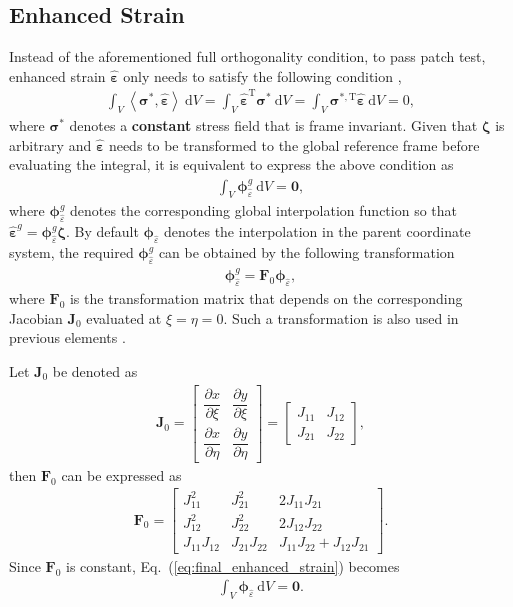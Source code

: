 \documentclass[3p,sort&compress,review,11pt]{elsarticle}
\newcommand*{\md}[1]{\mathrm{d}#1}
\newcommand*{\mT}{\mathrm{T}}
\newcommand*{\pfrac}[2]{\dfrac{\partial#1}{\partial#2}}
\newcommand*{\eqsref}[1]{Eq.~(\ref{#1})}
\newcommand*{\mb}{\bm}
\begin{document}
\subsection{Enhanced Strain}
Instead of the aforementioned full orthogonality condition, to pass patch test, enhanced strain $\hat{\mb{\varepsilon}}$ only needs to satisfy the following condition \citep{Simo1990,Taylor1976},
\begin{gather*}
\int_V\left\langle\mb{\sigma}^*,\hat{\mb{\varepsilon}}\right\rangle~\md{V}=\int_V\hat{\mb{\varepsilon}}^\mT\mb{\sigma}^*~\md{V}=\int_V\mb{\sigma}^{*,\mT}\hat{\mb{\varepsilon}}~\md{V}=0,
\end{gather*}
where $\mb{\sigma}^*$ denotes a \textbf{constant} stress field that is frame invariant. Given that $\mb{\zeta}$ is arbitrary and $\hat{\mb{\varepsilon}}$ needs to be transformed to the global reference frame before evaluating the integral, it is equivalent to express the above condition as
\begin{gather}\label{eq:final_enhanced_strain}
\int_V\mb{\phi}_{\hat{\varepsilon}}^g~\md{V}=\mb{0},
\end{gather}
where $\mb{\phi}_{\hat{\varepsilon}}^g$ denotes the corresponding global interpolation function so that $\hat{\mb{\varepsilon}}^g=\mb{\phi}_{\hat{\varepsilon}}^g\mb{\zeta}$. By default $\mb{\phi}_{\hat{\varepsilon}}$ denotes the interpolation in the parent coordinate system, the required $\mb{\phi}_{\hat{\varepsilon}}^g$ can be obtained by the following transformation
\begin{gather}\label{eq:enhanced_strain_trans}
\mb{\phi}_{\hat{\varepsilon}}^g=\mb{F}_0\mb{\phi}_{\hat{\varepsilon}},
\end{gather}
where $\mb{F}_0$ is the transformation matrix that depends on the corresponding Jacobian $\mb{J}_0$ evaluated at $\xi=\eta=0$. Such a transformation is also used in previous elements \citep[e.g.,][]{Pian1984}.

Let $\mb{J}_0$ be denoted as
\begin{gather*}
\mb{J}_0=\begin{bmatrix}
\pfrac{x}{\xi}&\pfrac{y}{\xi}\\[3mm]
\pfrac{x}{\eta}&\pfrac{y}{\eta}
\end{bmatrix}=\begin{bmatrix}
J_{11}&J_{12}\\[2mm]
J_{21}&J_{22}
\end{bmatrix},
\end{gather*}
then $\mb{F}_0$ can be expressed as
\begin{gather}
\mb{F}_0=\begin{bmatrix}
	J_{11}^2     & J_{21}^2     & 2J_{11}J_{21}             \\
	J_{12}^2     & J_{22}^2     & 2J_{12}J_{22}             \\
	J_{11}J_{12} & J_{21}J_{22} & J_{11}J_{22}+J_{12}J_{21}
\end{bmatrix}.
\end{gather}
Since $\mb{F}_0$ is constant, \eqsref{eq:final_enhanced_strain} becomes
\begin{gather}\label{eq:new_enhanced_strain}
\int_V\mb{\phi}_{\hat{\varepsilon}}~\md{V}=\mb{0}.
\end{gather}
\end{document}
